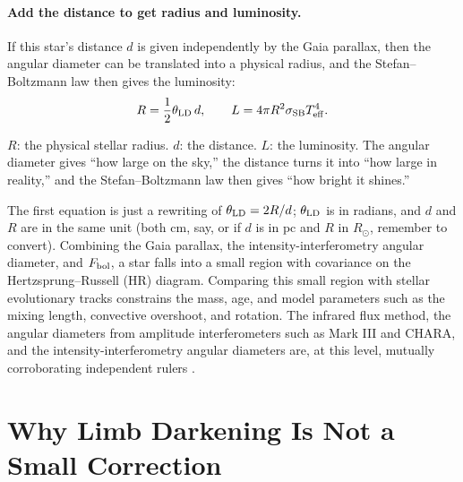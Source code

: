 \paragraph{Add the distance to get radius and luminosity.}
\label{sec:e17-radius}

If this star's distance \(d\) is given independently by the Gaia parallax, then the angular diameter can be translated into a physical radius, and the Stefan--Boltzmann law then gives the luminosity:
\begin{equation}
  R=\frac{1}{2}\theta_{\rm LD}\,d,\qquad
  L=4\pi R^2\sigma_{\rm SB}T_{\rm eff}^4 .
  \label{eq:e17-radius}
\end{equation}
\begin{formulaexplain}
\(R\): the physical stellar radius. \(d\): the distance. \(L\): the luminosity. The angular diameter gives ``how large on the sky,'' the distance turns it into ``how large in reality,'' and the Stefan--Boltzmann law then gives ``how bright it shines.''
\end{formulaexplain}
The first equation is just a rewriting of \(\theta_{\rm LD}=2R/d\); \(\theta_{\rm LD}\) is in radians, and \(d\) and \(R\) are in the same unit (both cm, say, or if \(d\) is in pc and \(R\) in \(R_\odot\), remember to convert). Combining the Gaia parallax, the intensity-interferometry angular diameter, and \(F_{\rm bol}\), a star falls into a small region with covariance on the Hertzsprung--Russell (HR) diagram. Comparing this small region with stellar evolutionary tracks constrains the mass, age, and model parameters such as the mixing length, convective overshoot, and rotation. The infrared flux method, the angular diameters from amplitude interferometers such as Mark III and CHARA, and the intensity-interferometry angular diameters are, at this level, mutually corroborating independent rulers \citep{1977MNRAS.180..177B,1991AJ....101.2207M,1994A&A...282..899B,2003AJ....126.2502M,2005ApJ...626..446R}.

\section{Why Limb Darkening Is Not a Small Correction}
\label{sec:e17-limb-darkening}

